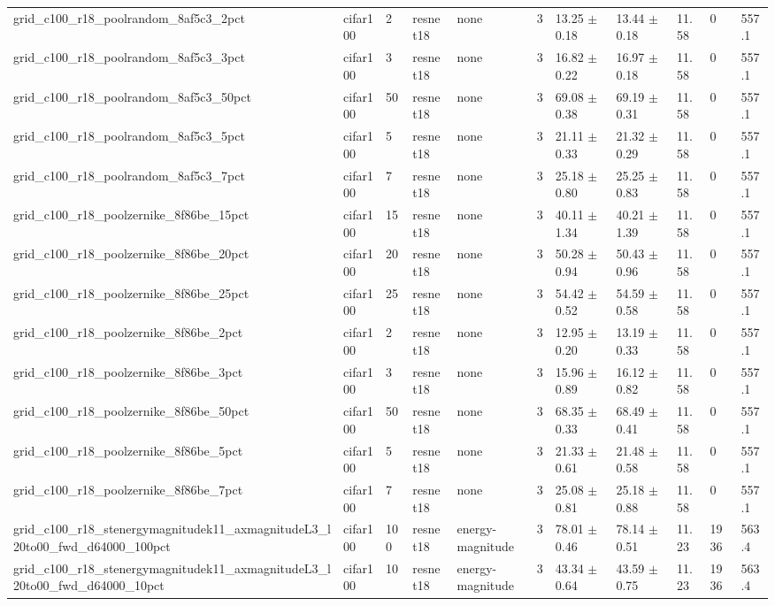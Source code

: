\begin{tabular}{lllllllllll}
grid_c100_r18_poolrandom_8af5c3_2pct & cifar100 & 2 & resnet18 & none & 3 & 13.25 $\pm$ 0.18 & 13.44 $\pm$ 0.18 & 11.58 & 0 & 557.1 \\
grid_c100_r18_poolrandom_8af5c3_3pct & cifar100 & 3 & resnet18 & none & 3 & 16.82 $\pm$ 0.22 & 16.97 $\pm$ 0.18 & 11.58 & 0 & 557.1 \\
grid_c100_r18_poolrandom_8af5c3_50pct & cifar100 & 50 & resnet18 & none & 3 & 69.08 $\pm$ 0.38 & 69.19 $\pm$ 0.31 & 11.58 & 0 & 557.1 \\
grid_c100_r18_poolrandom_8af5c3_5pct & cifar100 & 5 & resnet18 & none & 3 & 21.11 $\pm$ 0.33 & 21.32 $\pm$ 0.29 & 11.58 & 0 & 557.1 \\
grid_c100_r18_poolrandom_8af5c3_7pct & cifar100 & 7 & resnet18 & none & 3 & 25.18 $\pm$ 0.80 & 25.25 $\pm$ 0.83 & 11.58 & 0 & 557.1 \\
grid_c100_r18_poolzernike_8f86be_15pct & cifar100 & 15 & resnet18 & none & 3 & 40.11 $\pm$ 1.34 & 40.21 $\pm$ 1.39 & 11.58 & 0 & 557.1 \\
grid_c100_r18_poolzernike_8f86be_20pct & cifar100 & 20 & resnet18 & none & 3 & 50.28 $\pm$ 0.94 & 50.43 $\pm$ 0.96 & 11.58 & 0 & 557.1 \\
grid_c100_r18_poolzernike_8f86be_25pct & cifar100 & 25 & resnet18 & none & 3 & 54.42 $\pm$ 0.52 & 54.59 $\pm$ 0.58 & 11.58 & 0 & 557.1 \\
grid_c100_r18_poolzernike_8f86be_2pct & cifar100 & 2 & resnet18 & none & 3 & 12.95 $\pm$ 0.20 & 13.19 $\pm$ 0.33 & 11.58 & 0 & 557.1 \\
grid_c100_r18_poolzernike_8f86be_3pct & cifar100 & 3 & resnet18 & none & 3 & 15.96 $\pm$ 0.89 & 16.12 $\pm$ 0.82 & 11.58 & 0 & 557.1 \\
grid_c100_r18_poolzernike_8f86be_50pct & cifar100 & 50 & resnet18 & none & 3 & 68.35 $\pm$ 0.33 & 68.49 $\pm$ 0.41 & 11.58 & 0 & 557.1 \\
grid_c100_r18_poolzernike_8f86be_5pct & cifar100 & 5 & resnet18 & none & 3 & 21.33 $\pm$ 0.61 & 21.48 $\pm$ 0.58 & 11.58 & 0 & 557.1 \\
grid_c100_r18_poolzernike_8f86be_7pct & cifar100 & 7 & resnet18 & none & 3 & 25.08 $\pm$ 0.81 & 25.18 $\pm$ 0.88 & 11.58 & 0 & 557.1 \\
grid_c100_r18_stenergymagnitudek11_axmagnitudeL3_l20to00_fwd_d64000_100pct & cifar100 & 100 & resnet18 & energy-magnitude & 3 & 78.01 $\pm$ 0.46 & 78.14 $\pm$ 0.51 & 11.23 & 1936 & 563.4 \\
grid_c100_r18_stenergymagnitudek11_axmagnitudeL3_l20to00_fwd_d64000_10pct & cifar100 & 10 & resnet18 & energy-magnitude & 3 & 43.34 $\pm$ 0.64 & 43.59 $\pm$ 0.75 & 11.23 & 1936 & 563.4 \\

\end{tabular}

